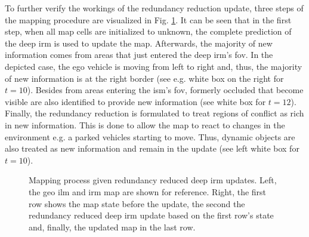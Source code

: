To further verify the workings of the redundancy reduction update, three steps of the mapping procedure are visualized in Fig. \ref{fig:viz_mapping_progress}. It can be seen that in the first step, when all map cells are initialized to unknown, the complete prediction of the deep \gls{irm} is used to update the map. Afterwards, the majority of new information comes from areas that just entered the deep \gls{irm}'s \gls{fov}. In the depicted case, the ego vehicle is moving from left to right and, thus, the majority of new information is at the right border (see e.g. white box on the right for $t=10$). Besides from areas entering the \gls{ism}'s \gls{fov}, formerly occluded that become visible are also identified to provide new information (see white box for $t=12$). Finally, the redundancy reduction is formulated to treat regions of conflict as rich in new information. This is done to allow the map to react to changes in the environment e.g. a parked vehicles starting to move. Thus, dynamic objects are also treated as new information and remain in the update (see left white box for $t=10$).
\begin{figure}[H]
	\begin{center}
		\caption{\label{fig:viz_mapping_progress}Mapping process given redundancy reduced deep \gls{irm} updates. Left, the geo \gls{ilm} and \gls{irm} map are shown for reference. Right, the first row shows the map state before the update, the second the redundancy reduced deep \gls{irm} update based on the first row's state and, finally, the updated map in the last row.}
	\end{center}
\end{figure}
%
